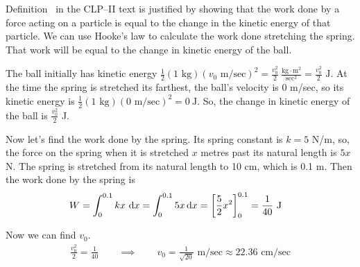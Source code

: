 \begin{solution}
Definition~  in the CLP--II text is justified by showing that the work done by a force acting on a particle is  equal to the change in the kinetic energy of that particle. We can use Hooke's law to calculate the work done stretching the spring. That work will be equal to the change in kinetic energy of the ball.

The ball initially has kinetic energy $\frac{1}{2}(1\text{ kg})(v_0 \text{ m/sec})^2 = \frac{v_0^2}{2}~\frac{\text{kg}\cdot\text{m}^2}{\text{sec}^2} = \frac{v_0^2}{2}\text{ J}$.  At the time the spring is stretched its farthest, the ball's velocity is 0 m/sec, so its kinetic energy is $\frac{1}{2}(1\text{ kg})(0 \text{ m/sec})^2 =0~\text{J}$. So, the change in kinetic energy of the ball is $\frac{v_0^2}{2}$ J.

Now let's find the work done by the spring. Its spring constant is $k=5$ N/m, so, the force on the spring when it is stretched $x$ metres past its natural length is $5x$ N. The spring is stretched from its natural length to 10 cm, which is 0.1 m. Then the work done by the spring is
\begin{align*}
W&=\int_0^{0.1} kx~\mathrm{d}x= \int_0^{0.1} 5x\,\mathrm{d}x = \left[\frac{5}{2}x^2\right]_0^{0.1} = \frac{1}{40} \text{ J}
\end{align*}

Now we can find $v_0$.
\begin{align*}
\frac{v_0^2}{2} =\frac{1}{40} \qquad \implies \qquad v_0 = \frac{1}{\sqrt{20}} \text{ m/sec} \approx 22.36 \text{ cm/sec}
\end{align*}

\end{solution}

